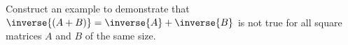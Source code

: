 Construct an example to demonstrate that $\inverse{(A+B)}=\inverse{A}+\inverse{B}$ is not true for all square matrices $A$ and $B$ of the same size.